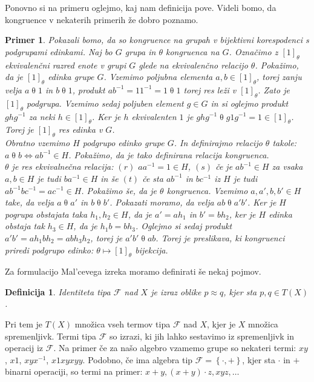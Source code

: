 \documentclass[a4paper,11pt]{article}
\newtheorem{definicija}{Definicija}
\newtheorem{primer}{Primer}
\begin{document}
Ponovno si na primeru oglejmo, kaj nam definicija pove. Videli bomo, da kongruence v nekaterih primerih že dobro poznamo.

\begin{primer}
 Pokazali bomo, da so kongruence na grupah v bijektivni korespodenci s podgrupami edinkami. 
 Naj bo $G$ grupa in $\theta$ kongruenca na $G$. Označimo z $\left[1\right]_{\theta}$ ekvivalenčni razred enote v grupi 
 $G$ glede na ekvivalenčno relacijo $\theta$. Pokažimo, da je $\left[1\right]_{\theta}$ edinka grupe $G$. Vzemimo 
 poljubna elementa $a, b \in \left[1\right]_{\theta}$, torej zanju velja $a \mathrel{\theta} 1$ in $b \mathrel{\theta} 1$, 
 produkt  $a b^{-1} = 1 1^{-1} = 1 \mathrel{\theta} 1$ torej res leži v $\left[1\right]_{\theta}$. Zato je 
 $\left[1\right]_{\theta}$ podgrupa. Vzemimo sedaj poljuben element $g \in G$ in si oglejmo produkt $g h g^{-1}$ za neki 
 $h \in  \left[1\right]_{\theta}$. Ker je $h$ ekvivalenten $1$ je $g h g^{-1} \mathrel{\theta} g 1 g^{-1} = 1 \in 
 \left[1\right]_{\theta}$. Torej je $\left[1\right]_{\theta}$ res edinka v $G$.\\
 Obratno vzemimo $H$ podgrupo edinko grupe $G$. In definirajmo relacijo $\theta$ takole: $a \mathrel{\theta} b 
 \Leftrightarrow a b^{-1} \in H$. Pokažimo, da je tako definirana relacija kongruenca.\\ 
 $\theta$ je res ekvivalnečna relacija: $(r)$ $aa^{-1}=
 1 \in H$, $(s)$ če je $ab^{-1} \in H$ za vsaka $a, b \in H$ je tudi $ba^{-1} \in H$ in še $(t)$ če sta $ab^{-1}$ in
 $bc^{-1}$ iz $H$ je tudi $ab^{-1} b c^{-1}= a c^{-1} \in H$. Pokažimo še, da je $\theta$ kongruenca. Vzemimo $a, a', 
 b, b'\in H$ take, da velja $a \mathrel{\theta} a'$ in $b \mathrel{\theta} b'$. Pokazati moramo, da velja $ab 
 \mathrel{\theta} a'b'$. Ker je $H$ pogrupa obstajata taka $h_1, h_2 \in H$, da je $a' = ah_1$ in $b' = b h_2$, 
 ker je $H$ edinka obstaja tak $h_3 \in H$, da je $h_1b = bh_3$. Oglejmo si sedaj produkt $a'b' = ah_1bh_2 = abh_3h_2$, 
 torej je $a'b' \mathrel{\theta} ab$. Torej je preslikava, ki kongruenci priredi podgrupo edinko: $\theta \mapsto 
 \left[1\right]_{\theta}$ bijekcija.

\end{primer}

Za formulacijo Mal'cevega izreka moramo definirati še nekaj pojmov. 
\begin{definicija}
    \emph{Identiteta} tipa $\mathcal{F}$ nad $X$ je izraz oblike $p \approx q$, kjer sta $p, q \in T\left(X\right)$.
\end{definicija}
Pri tem je $T\left(X\right)$ množica vseh termov tipa $\mathcal{F}$ nad $X$, kjer je $X$ množica spremenljivk. Termi 
tipa $\mathcal{F}$ so izrazi, ki jih lahko sestavimo iz spremenljivk in operacij iz $\mathcal{F}$. Na primer če za našo 
algebro vzamemo grupe so nekateri termi: $xy$, $x1$, $xyx^{-1}$, $x1xyxyy$. Podobno, če ima algebra tip $\mathcal{F} =
\left\{\cdot, +\right\}$, kjer sta $\cdot$ in $+$ binarni operaciji, so termi na primer: $x+y, (x+y) \cdot z, xyz, \ldots$
\end{document}
